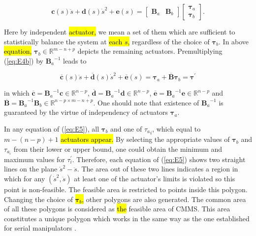 \documentclass{rob}%
\begin{document}
\begin{equation}
\label{eq:E4b}
{\boldsymbol c}(s)\ddot s+{\boldsymbol d}(s)\dot s^2+{\boldsymbol e}(s)=
\begin{bmatrix} {\mathbf B}_{a} & {\mathbf B}_{b} \end{bmatrix}
\begin{bmatrix} \boldsymbol{\tau}_{a} \\ \boldsymbol{\tau}_{b} \end{bmatrix}.   
\end{equation}


\noindent
Here by independent \hl{actuator,} we mean a set of them which are sufficient to statistically balance the system at \hl{each $ s $,} regardless of the choice of $ \boldsymbol \tau_{b} $. In above \hl{equation,} $ \boldsymbol \tau_{b}\in \mathbb{R}^{m-n+p} $ depicts the remaining actuators.
Premultiplying (\ref{eq:E4b}) by $ {{\mathbf B}_{a}}^{-1} $ leads to


\begin{equation}
\label{eq:E5}
{\overline{\boldsymbol c}}(s)\ddot s+{\overline{\boldsymbol d}}(s)\dot s^2+{\overline{\boldsymbol e}}(s)
=\boldsymbol{\tau}_{a} + {\overline{\mathbf  B}} \boldsymbol{\tau}_{b}
=\boldsymbol{\tau}^\prime         
\end{equation}

\noindent
in which $ {\overline{\boldsymbol c}}={{\mathbf B}_{a}}^{-1} {\boldsymbol c}\in \mathbb{R}^{n-p} $,
$ {\overline{\boldsymbol d}}={{\mathbf B}_{a}}^{-1} {\boldsymbol d}\in \mathbb{R}^{n-p} $,
$ {\overline{\boldsymbol e}}={{\mathbf B}_{a}}^{-1} {\boldsymbol e}\in \mathbb{R}^{n-p} $ and
$ {\overline{\mathbf  B}}={{\mathbf B}_{a}}^{-1} {{\mathbf B}}_b\in \mathbb{R}^{n-p\times m-n+p} $.
One should note that existence of $ {{\mathbf B}_{a}}^{-1} $ is guaranteed by the virtue of independency of actuators $ \boldsymbol{\tau}_{a} $.

In any equation of (\ref{eq:E5}), all $ {\boldsymbol \tau}_b $ and one of $ {{\tau}_{a}}_i $, which equal to $ m-(n-p)+1 $ \hl{actuators appear.} 
By selecting the appropriate values of $ \boldsymbol{\tau}_{b} $ and $ \tau_{{a}_i} $ from their lower or upper bound, one could obtain the minimum and maximum values for $ {\tau}^\prime_i $.
Therefore, each equation of (\ref{eq:E5}) shows two straight lines on the plane $ \dot s^2-\ddot s $. The area out of these two lines indicates a region in which for any $ (\dot s^2, \ddot s) $ at least one of the actuator's limits is violated so this point is non-feasible. 
The feasible area is restricted to points inside this polygon. Changing the choice of \hl{$ \boldsymbol \tau_b $,} other polygons are also generated.
The common area of all these polygons is considered as \hl{the} feasible area of CMMS. This area constitutes a unique polygon which works in the same way as the one established for serial manipulators \cite{Pfeiffer1987}. 
\end{document}

